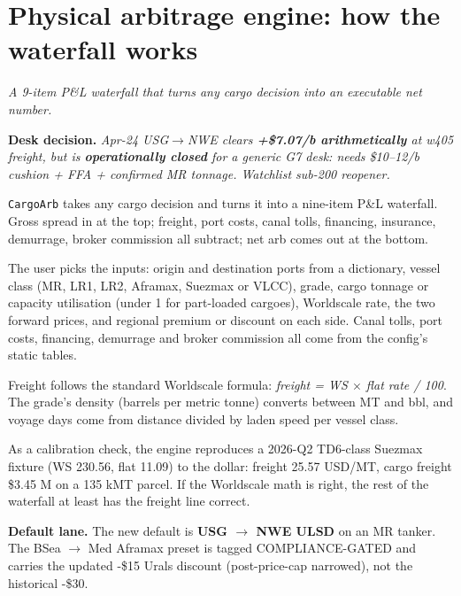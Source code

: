 \documentclass[10pt,a4paper]{article}
\begin{document}
\section{Physical arbitrage engine: how the waterfall works}\label{sec:11}

\textit{A 9-item P\&L waterfall that turns any cargo decision into an executable net number.}

\noindent\textcolor{obred}{\textbf{Desk decision.}} \emph{Apr-24 USG$\rightarrow$NWE clears \textbf{+\$7.07/b arithmetically} at w405 freight, but is \textbf{operationally closed} for a generic G7 desk: needs \$10--12/b cushion + FFA + confirmed MR tonnage. Watchlist sub-200 reopener.}

\vspace{0.2cm}

\noindent\begin{minipage}[t]{0.46\linewidth}\vspace{0pt}

\texttt{CargoArb} takes any cargo decision and turns it into a nine-item P\&L waterfall. Gross spread in at the top; freight, port costs, canal tolls, financing, insurance, demurrage, broker commission all subtract; net arb comes out at the bottom.

The user picks the inputs: origin and destination ports from a dictionary, vessel class (MR, LR1, LR2, Aframax, Suezmax or VLCC), grade, cargo tonnage or capacity utilisation (under 1 for part-loaded cargoes), Worldscale rate, the two forward prices, and regional premium or discount on each side. Canal tolls, port costs, financing, demurrage and broker commission all come from the config's static tables.

Freight follows the standard Worldscale formula: \emph{freight = WS $\times$ flat rate / 100}. The grade's density (barrels per metric tonne) converts between MT and bbl, and voyage days come from distance divided by laden speed per vessel class.

As a calibration check, the engine reproduces a 2026-Q2 TD6-class Suezmax fixture (WS 230.56, flat 11.09) to the dollar: freight 25.57 USD/MT, cargo freight \$3.45 M on a 135 kMT parcel. If the Worldscale math is right, the rest of the waterfall at least has the freight line correct.

\textbf{Default lane.} The new default is \textbf{USG $\rightarrow$ \mbox{NWE} ULSD} on an MR tanker. The BSea $\rightarrow$ Med Aframax preset is tagged COMPLIANCE-GATED and carries the updated -\$15 Urals discount (post-price-cap narrowed), not the historical -\$30.


\end{minipage}
\end{document}
